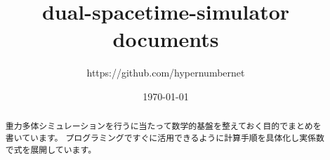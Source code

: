 \documentclass[a4paper,12pt,notitlepage]{jsreport}
\title{dual-spacetime-simulator documents}
\author{https://github.com/hypernumbernet}
\date{\today}
\begin{document}
\maketitle

\begin{abstract}
  重力多体シミュレーションを行うに当たって数学的基盤を整えておく目的でまとめを書いています。
  プログラミングですぐに活用できるように計算手順を具体化し実係数で式を展開しています。
\end{abstract}

\clearpage
\tableofcontents
\clearpage














\end{document}
